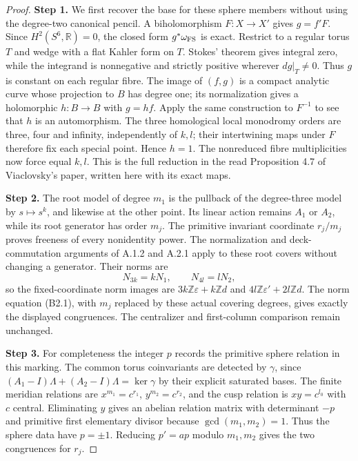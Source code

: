 \begin{proof}
\par\smallskip\noindent\textbf{Step 1.} We first recover the base for these sphere members without using the degree-two canonical pencil. A biholomorphism $F:X\to X'$ gives $g=f'F$. Since $H^2(S^6,\mathbb R)=0$, the closed form $g^*\omega_{\rm FS}$ is exact. Restrict to a regular torus $T$ and wedge with a flat Kahler form on $T$. Stokes' theorem gives integral zero, while the integrand is nonnegative and strictly positive wherever $dg|_T\ne0$. Thus $g$ is constant on each regular fibre. The image of $(f,g)$ is a compact analytic curve whose projection to $B$ has degree one; its normalization gives a holomorphic $h:B\to B$ with $g=hf$. Apply the same construction to $F^{-1}$ to see that $h$ is an automorphism. The three homological local monodromy orders are three, four and infinity, independently of $k,l$; their intertwining maps under $F$ therefore fix each special point. Hence $h=1$. The nonreduced fibre multiplicities now force equal $k,l$. This is the full reduction in the read Proposition 4.7 of Viaclovsky's paper, written here with its exact maps.

\par\smallskip\noindent\textbf{Step 2.} The root model of degree $m_1$ is the pullback of the degree-three model by $s\mapsto s^k$, and likewise at the other point. Its linear action remains $A_1$ or $A_2$, while its root generator has order $m_j$. The primitive invariant coordinate $r_j/m_j$ proves freeness of every nonidentity power. The normalization and deck-commutation arguments of A.1.2 and A.2.1 apply to these root covers without changing a generator. Their norms are
\[
 N_{3k}=kN_1,\qquad N_{4l}=lN_2,
\]
so the fixed-coordinate norm images are $3k\mathbb Z\varepsilon+k\mathbb Zd$ and $4l\mathbb Z\varepsilon'+2l\mathbb Zd$. The norm equation (B2.1), with $m_j$ replaced by these actual covering degrees, gives exactly the displayed congruences. The centralizer and first-column comparison remain unchanged.

\par\smallskip\noindent\textbf{Step 3.} For completeness the integer $p$ records the primitive sphere relation in this marking. The common torus coinvariants are detected by $\gamma$, since $(A_1-I)\Lambda+(A_2-I)\Lambda=\ker\gamma$ by their explicit saturated bases. The finite meridian relations are $x^{m_1}=c^{r_1}$, $y^{m_2}=c^{r_2}$, and the cusp relation is $xy=c^{l_0}$ with $c$ central. Eliminating $y$ gives an abelian relation matrix with determinant $-p$ and primitive first elementary divisor because $\gcd(m_1,m_2)=1$. Thus the sphere data have $p=\pm1$. Reducing $p'=ap$ modulo $m_1,m_2$ gives the two congruences for $r_j$.


\end{proof}
